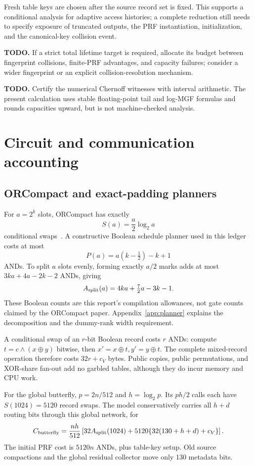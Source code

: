 \documentclass[11pt]{article}
\newcommand{\xor}{\mathbin{\oplus}}
\newcommand{\AND}{\mathbin{\wedge}}
\newcommand{\todo}[1]{\par\textbf{TODO.} #1\par}
\begin{document}
Fresh table keys are chosen after the source record set is fixed. This
supports a conditional analysis for adaptive access histories; a complete
reduction still needs to specify exposure of truncated outputs, the PRF
instantiation, initialization, and the canonical-key collision event.
\todo{If a strict total lifetime target is required, allocate its budget
between fingerprint collisions, finite-PRF advantages, and capacity failures;
consider a wider fingerprint or an explicit collision-resolution mechanism.}
\todo{Certify the numerical Chernoff witnesses with interval arithmetic.
The present calculation uses stable floating-point tail and log-MGF formulas
and rounds capacities upward, but is not machine-checked analysis.}

\section{Circuit and communication accounting}\label{sec:cost}
\subsection{ORCompact and exact-padding planners}
For $a=2^k$ slots, ORCompact has exactly
\begin{equation}
 S(a)=\frac a2\log_2a
\end{equation}
conditional swaps~\cite{orcompact}. A constructive Boolean schedule planner
used in this ledger costs at most
\begin{equation}
 P(a)=a(k-\tfrac12)-k+1
\end{equation}
ANDs. To split $a$ slots evenly, forming exactly $a/2$ marks adds at most
$3ka+4a-2k-2$ ANDs, giving
\begin{equation}
 A_{\rm split}(a)=4ka+\tfrac72a-3k-1.
\end{equation}
These Boolean counts are this report's compilation allowances, not gate
counts claimed by the ORCompact paper. Appendix~\ref{app:planner} explains
the decomposition and the dummy-rank width requirement.

A conditional swap of an $r$-bit Boolean record costs $r$ ANDs: compute
$t=c\AND(x\xor y)$ bitwise, then $x'=x\xor t,y'=y\xor t$.
The complete mixed-record operation therefore costs $32r+c_V$ bytes.
Public copies, public permutations, and XOR-share fan-out add no garbled
tables, although they do incur memory and CPU work.

For the global butterfly, $p=2n/512$ and $h=\log_2p$. Its $ph/2$ calls
each have $S(1024)=5120$ record swaps. The model conservatively carries
all $h+d$ routing bits through this global network, for
\begin{equation}
 C_{\rm butterfly}=
 \frac{nh}{512}\left[32A_{\rm split}(1024)
              +5120\{32(130+h+d)+c_V\}\right].
\end{equation}
The initial PRF cost is $5120n$ ANDs, plus table-key setup. Old source
compactions and the global residual collector move only 130 metadata bits.
\end{document}
